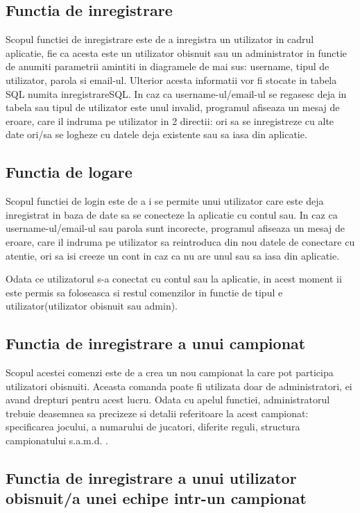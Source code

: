 \documentclass{article}
\begin{document}
\subsection{Functia de inregistrare}
\quad Scopul functiei de inregistrare este de a inregistra un utilizator in cadrul aplicatie, fie ca acesta este un utilizator obisnuit sau un administrator in functie de anumiti parametrii amintiti in diagramele de mai sus: username, tipul de utilizator, parola si email-ul. Ulterior acesta informatii vor fi stocate in tabela SQL numita inregistrareSQL. In caz ca username-ul/email-ul se regasesc deja in tabela sau tipul de utilizator este unul invalid, programul afiseaza un mesaj de eroare, care il indruma pe utilizator in 2 directii: ori sa se inregistreze cu alte date ori/sa se logheze cu datele deja existente sau sa iasa din aplicatie.

\subsection{Functia de logare}
\quad Scopul functiei de login este de a i se permite  unui utilizator care este deja inregistrat in baza de date sa se conecteze la aplicatie cu contul sau. In caz ca username-ul/email-ul sau parola sunt incorecte, programul afiseaza un mesaj de eroare, care il indruma pe utilizator sa reintroduca din nou datele de conectare cu atentie, ori sa isi creeze un cont in caz ca nu are unul sau sa iasa din aplicatie.

Odata ce utilizatorul s-a conectat cu contul sau la aplicatie, in acest moment ii este permis sa foloseasca si restul comenzilor in functie de tipul e utilizator(utilizator obisnuit sau admin).

\subsection{Functia de inregistrare a unui campionat}

\quad Scopul acestei comenzi este de a crea un nou campionat la care pot participa utilizatori obisnuiti. Aceasta comanda poate fi utilizata doar de administratori, ei avand drepturi pentru acest lucru. Odata cu apelul functiei, administratorul trebuie deasemnea sa precizeze si detalii referitoare la acest campionat: specificarea jocului, a numarului de jucatori, diferite reguli, structura campionatului s.a.m.d. .

\subsection{Functia de inregistrare a unui utilizator obisnuit/a unei echipe intr-un campionat}
\end{document}
